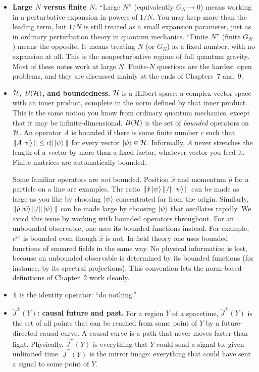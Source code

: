 \begin{itemize}
\item \textbf{Large $N$ versus finite $N$.} ``Large $N$'' (equivalently $G_N\to0$) means working in a
perturbative expansion in powers of $1/N$. You may keep more than the leading term, but $1/N$ is still
treated as a small expansion parameter, just as in ordinary perturbation theory in quantum mechanics.
``Finite $N$'' (finite $G_N$) means the opposite. It means treating $N$ (or $G_N$) as a fixed number, with no
expansion at all. This is the nonperturbative regime of full quantum gravity. Most of these notes work at large
$N$. Finite-$N$ questions are the hardest open problems, and they are discussed mainly at the ends of
Chapters~7 and~9.

\item \textbf{$\mathcal{H}$, $B(\mathcal{H})$, and boundedness.} $\mathcal{H}$ is a Hilbert space: a complex vector space with an
inner product, complete in the norm defined by that inner product. This is the same notion you know from
ordinary quantum mechanics, except that it may be infinite-dimensional. $B(\mathcal{H})$ is the set of
\emph{bounded} operators on $\mathcal{H}$. An operator $A$ is bounded if there is some finite number $c$ such that
$\|A\ket\psi\|\le c\|\ket\psi\|$ for every vector $\ket\psi\in\mathcal{H}$. Informally, $A$ never stretches the length
of a vector by more than a fixed factor, whatever vector you feed it. Finite matrices are automatically
bounded.

Some familiar operators are \emph{not} bounded. Position $\hat x$ and momentum $\hat p$ for a particle on a
line are examples. The ratio $\|\hat x\ket\psi\|/\|\ket\psi\|$ can be made as large as you like by choosing
$\ket\psi$ concentrated far from the origin. Similarly, $\|\hat p\ket\psi\|/\|\ket\psi\|$ can be made large
by choosing $\ket\psi$ that oscillates rapidly. We avoid this issue by working with bounded operators
throughout. For an unbounded observable, one uses its bounded functions instead. For example, $e^{i\hat x}$ is
bounded even though $\hat x$ is not. In field theory one uses bounded functions of smeared fields in the same
way. No physical information is lost, because an unbounded observable is determined by its bounded functions
(for instance, by its spectral projections). This convention lets the norm-based definitions of Chapter~2
work cleanly.

\item \textbf{$\mathbf{1}$} is the identity operator: ``do nothing.''

\item \textbf{$\widetilde J^\pm(Y)$: causal future and past.} For a region $Y$ of a spacetime,
$\widetilde J^+(Y)$ is the set of all points that can be reached from some point of $Y$ by a future-directed
causal curve. A causal curve is a path that never moves faster than light. Physically, $\widetilde J^+(Y)$ is
everything that $Y$ could send a signal to, given unlimited time. $\widetilde J^-(Y)$ is the mirror image:
everything that could have sent a signal to some point of $Y$.


\end{itemize}
